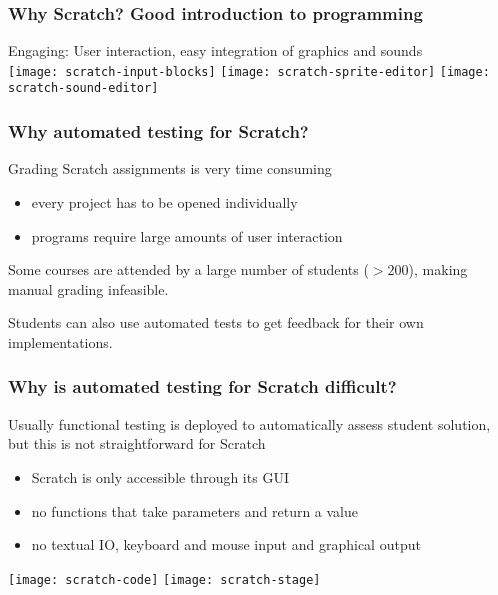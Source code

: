 \begin{frame}\frametitle{Why Scratch? Good introduction to programming}
    \centering
    Engaging: User interaction, easy integration of graphics and sounds\\[\medskipamount]
    \texttt{[image: scratch-input-blocks]}
    \texttt{[image: scratch-sprite-editor]}
    \texttt{[image: scratch-sound-editor]}
\end{frame}

\begin{frame}
\end{frame}

\begin{frame}\frametitle{Why automated testing for Scratch?}
    Grading Scratch assignments is very time consuming
    \begin{itemize}
        \item every project has to be opened individually
        \item programs require large amounts of user interaction
    \end{itemize}

    \bigskip

    Some courses are attended by a large number of students ($> 200$), making manual grading infeasible.

    \bigskip

    Students can also use automated tests to get feedback for their own implementations.
\end{frame}

\begin{frame}
\end{frame}

\begin{frame}\frametitle{Why is automated testing for Scratch difficult?}
    Usually functional testing is deployed to automatically assess student solution,
    but this is not straightforward for Scratch
    \begin{itemize}
        \item Scratch is only accessible through its GUI
        \item no functions that take parameters and return a value
        \item no textual IO, keyboard and mouse input and graphical output
    \end{itemize}

    \bigskip

    \centering
    \texttt{[image: scratch-code]}
    \hspace{1em}
    \texttt{[image: scratch-stage]}
\end{frame}

